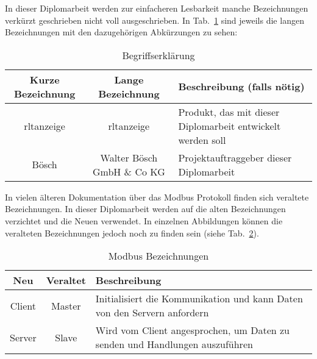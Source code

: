  \label{begriffserklaerung}
In dieser Diplomarbeit werden zur einfacheren Lesbarkeit manche Bezeichnungen verkürzt geschrieben \bzw nicht voll ausgeschrieben. In Tab.~\ref{tab:begriffserklaerung} sind jeweils die langen Bezeichnungen mit den dazugehörigen Abkürzungen zu sehen:
\begin{table}[h]
	\caption{Begriffserklärung \label{tab:begriffserklaerung}}
	\begin{tabularx}{\textwidth}{@{}c|c|X@{}}
		\toprule
		\textbf{Kurze Bezeichnung} & \textbf{Lange Bezeichnung} & \textbf{Beschreibung (falls nötig)} \\
		\midrule
		\acs{rltanzeige} & \acl{rltanzeige} &  Produkt, das mit dieser Diplomarbeit entwickelt werden soll \\
		Bösch & Walter Bösch GmbH \& Co KG & Projektauftraggeber dieser Diplomarbeit \\
		\bottomrule
	\end{tabularx}
\end{table}


In vielen älteren Dokumentation über das Modbus Protokoll finden sich veraltete Bezeichnungen. In dieser Diplomarbeit werden auf die alten Bezeichnungen verzichtet und die Neuen verwendet. In einzelnen Abbildungen können die veralteten Bezeichnungen jedoch noch zu finden sein (siehe Tab.~\ref{tab:modbus_bezeichnung}). 
\begin{table}[h]
	\caption{Modbus Bezeichnungen \label{tab:modbus_bezeichnung}}
	\begin{tabularx}{\textwidth}{@{}c|c|X@{}}
		\toprule
		\textbf{Neu} & \textbf{Veraltet} & \textbf{Beschreibung} \\
		\midrule
		Client & Master & Initialisiert die Kommunikation und kann Daten von den Servern anfordern \\
		Server & Slave & Wird vom Client angesprochen, um Daten zu senden und Handlungen auszuführen \\
		\bottomrule
	\end{tabularx}
\end{table}

